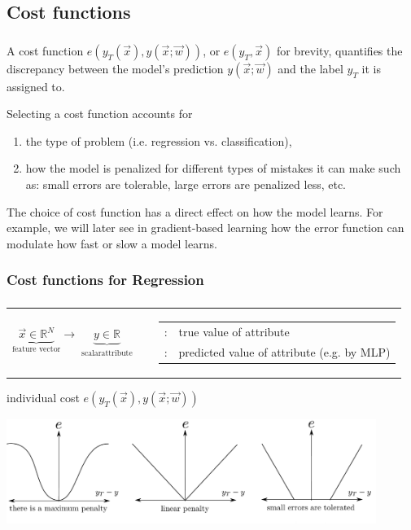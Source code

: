 \subsection{Cost functions}
\begin{frame}\frametitle{\subsecname}

A cost function $e\left(y_T(\vec x), y(\vec x; \vec w)\right)$, or $e(y_T, \vec x)$ for brevity, quantifies the discrepancy between the model's prediction $y(\vec x; \vec w)$ and the label $y_T$ it is assigned to.

Selecting a cost function accounts for 
\begin{enumerate}
\item the type of problem (i.e. regression vs. classification), 
\item how the model is penalized for different types of mistakes it can make such as:
small errors are tolerable, large errors are penalized less, etc.
\end{enumerate}

The choice of cost function has a direct effect on how the model learns. For example, we will later see in gradient-based learning how the error function can modulate how fast or slow a model learns.

\end{frame}

\subsubsection{Cost functions for Regression}

\begin{frame}\frametitle{\subsecname}

  \begin{tabular}{c c c}
    \parbox{4cm}{
      \[ \underbrace{\vec{x}
          \in \mathbb{R}^N
      }_{\text{feature vector}}
      \longrightarrow 
      \underbrace{y
      \in \mathbb{R}
      }_{\substack{\text{scalar}\\ \text{attribute}}}
      \]}
    & & 
    \parbox{8cm}{\footnotesize
      \begin{tabular}{l l}
	$y_T(\vec x)$: & true value of attribute \\
	$y(\vec{x}; \vec w)$: & predicted value of attribute (e.g. by MLP)
      \end{tabular}
    }
  \end{tabular}
     \pause

  \begin{block}{individual cost $e(y_T(\vec x), y(\vec x; \vec w))$}
    \begin{center} \includegraphics[width=12cm]{img/section1_fig17_v2.pdf} \end{center}
  \end{block}
\end{frame}

